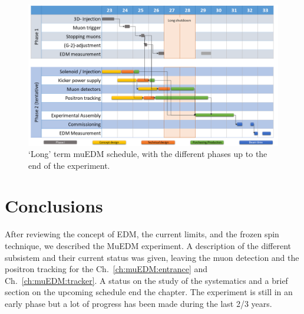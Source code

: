 \begin{refsection}
    \begin{figure}
        \centering
        \includegraphics[width = \textwidth]{Figures/muEDM/SchedPropLongTerm23.png}
        \caption{`Long' term muEDM schedule, with the different phases up to the end of the experiment.}
        \label{fig:muEDM:schedule:long}
    \end{figure}

\section{Conclusions}
    After reviewing the concept of EDM, the current limits, and the frozen spin technique, we described the MuEDM experiment.
    A description of the different subsistem and their current status was given, leaving the muon detection and the positron tracking for the Ch.~\ref{ch:muEDM:entrance} and Ch.~\ref{ch:muEDM:tracker}.
    A status on the study of the systematics and a brief section on the upcoming schedule end the chapter.
    The experiment is still in an early phase but a lot of progress has been made during the last 2/3 years.
\printbibliography[
    heading = bibliographychapter,
    title=Bibliography on muEDM
]

\end{refsection}
